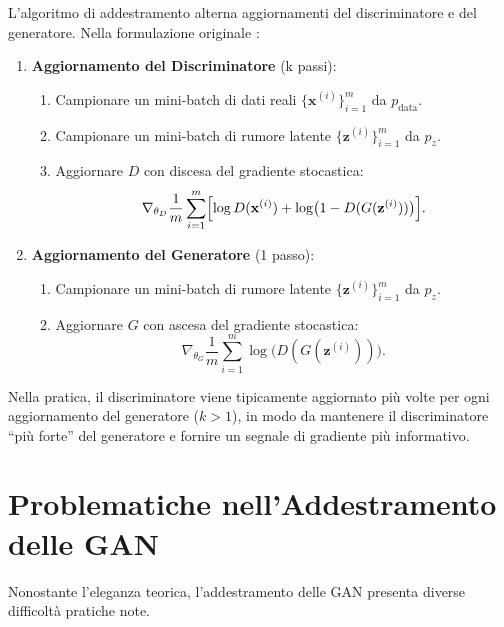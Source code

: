 L'algoritmo di addestramento alterna aggiornamenti del discriminatore e
del generatore. Nella formulazione originale \citep{bishop2024}:

\begin{enumerate}
  \item \textbf{Aggiornamento del Discriminatore} (k passi):
        \begin{enumerate}
          \item Campionare un mini-batch di dati reali
                $\{\mathbf{x}^{(i)}\}_{i=1}^{m}$ da $p_{\text{data}}$.
          \item Campionare un mini-batch di rumore latente
                $\{\mathbf{z}^{(i)}\}_{i=1}^{m}$ da $p_z$.
          \item Aggiornare $D$ con discesa del gradiente stocastica:
                \[
                  \nabla_{\theta_D} \frac{1}{m} \sum_{i=1}^{m}
                  \Bigl[\log D(\mathbf{x}^{(i)})
                       + \log\bigl(1 - D(G(\mathbf{z}^{(i)}))\bigr)\Bigr].
                \]
        \end{enumerate}
  \item \textbf{Aggiornamento del Generatore} (1 passo):
        \begin{enumerate}
          \item Campionare un mini-batch di rumore latente
                $\{\mathbf{z}^{(i)}\}_{i=1}^{m}$ da $p_z$.
          \item Aggiornare $G$ con ascesa del gradiente stocastica:
                \[
                  \nabla_{\theta_G} \frac{1}{m} \sum_{i=1}^{m}
                  \log\bigl(D(G(\mathbf{z}^{(i)}))\bigr).
                \]
        \end{enumerate}
\end{enumerate}

Nella pratica, il discriminatore viene tipicamente aggiornato più volte
per ogni aggiornamento del generatore ($k > 1$), in modo da mantenere
il discriminatore ``più forte'' del generatore e fornire un segnale di
gradiente più informativo.

\section{Problematiche nell'Addestramento delle GAN}
\label{sec:gan-issues}

Nonostante l'eleganza teorica, l'addestramento delle GAN presenta
diverse difficoltà pratiche note.

